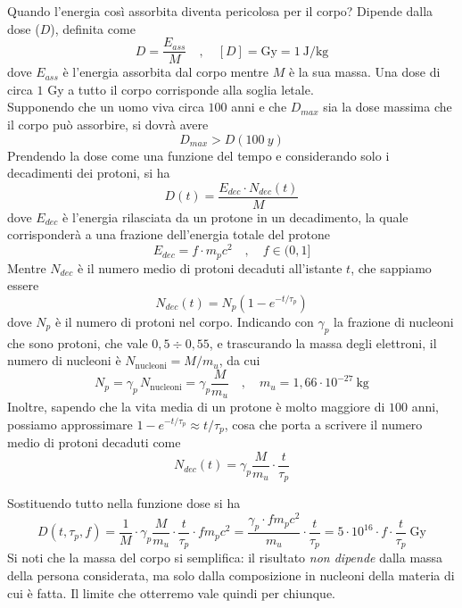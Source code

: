 Quando l'energia così assorbita diventa pericolosa per il corpo? Dipende dalla dose ($D$), definita come
%
\begin{equation}
    D = \frac{E_{ass}}{M} \quad , \quad [D] = \text{Gy} = 1 \ \text{J}/\text{kg}
\end{equation}
dove $E_{ass}$ è l'energia assorbita dal corpo mentre $M$ è la sua massa. Una dose di circa $1$ Gy a tutto il corpo corrisponde alla soglia letale.\\

Supponendo che un uomo viva circa $100$ anni e che $D_{max}$ sia la dose massima che il corpo può assorbire, si dovrà avere 
%
\begin{equation}
    D_{max} > D(100 \ y)
    \label{eq:disuguaglianza_dose}
\end{equation}
Prendendo la dose come una funzione del tempo e considerando solo i decadimenti dei protoni, si ha 
%
\begin{equation}
    D(t) = \frac{E_{dec} \cdot N_{dec}(t)}{M}
\end{equation}
dove $E_{dec}$ è l'energia rilasciata da un protone in un decadimento, la quale corrisponderà a una frazione dell'energia totale del protone
%
\begin{equation*}
    E_{dec} = f \cdot m_p c^2 \quad , \quad f \in (0,1]
\end{equation*}
Mentre $N_{dec}$ è il numero medio di protoni decaduti all'istante $t$, che sappiamo essere 
%
\begin{equation*}
    N_{dec}(t) = N_p \left(1 - e^{-t/\tau_p}\right)
\end{equation*}
dove $N_p$ è il numero di protoni nel corpo. Indicando con $\gamma_p$ la frazione di nucleoni che sono protoni, che vale $0,5 \div 0,55$, e trascurando la massa degli elettroni, il numero di nucleoni è $N_{\text{nucleoni}} = M/m_u$, da cui
%
\begin{equation*}
    N_p = \gamma_p \, N_{\text{nucleoni}} = \gamma_p \frac{M}{m_u} \quad , \quad m_u = 1,66 \cdot 10^{-27} \ \text{kg}
\end{equation*}
Inoltre, sapendo che la vita media di un protone è molto maggiore di $100$ anni, possiamo approssimare $1 - e^{-t/\tau_p} \approx t/\tau_p$, cosa che porta a scrivere il numero medio di protoni decaduti come 
%
\begin{equation*}
    N_{dec}(t) = \gamma_p \frac{M}{m_u}\cdot \frac{t}{\tau_p}
\end{equation*}

Sostituendo tutto nella funzione dose si ha 
%
\begin{equation*}
    D(t,\tau_p, f) = \frac{1}{M} \cdot \gamma_p \frac{M}{m_u} \cdot \frac{t}{\tau_p} \cdot f m_p c^2 = \frac{\gamma_p \cdot f m_p c^2}{ m_u} \cdot \frac{t}{\tau_p} = 5 \cdot 10^{16} \cdot f \cdot \frac{t}{\tau_p} \ \text{Gy}
\end{equation*}
Si noti che la massa del corpo si semplifica: il risultato \emph{non dipende} dalla massa della persona considerata, ma solo dalla composizione in nucleoni della materia di cui è fatta. Il limite che otterremo vale quindi per chiunque.\\

